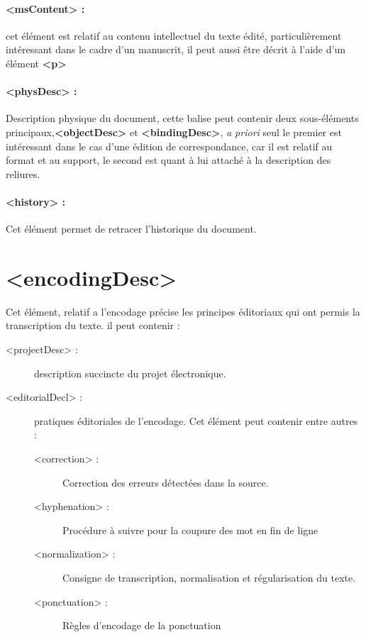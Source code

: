 \documentclass[18pt,a4paper,oneside]{book} %
\begin{document}
\paragraph{<msContent> :}

cet élément est relatif au contenu intellectuel du texte édité, particulièrement intéressant dans le cadre d'un manuscrit, il peut aussi être décrit à l'aide d'un élément \textbf{<p>}

\paragraph{<physDesc> :}

Description physique du document, cette balise peut contenir deux sous-éléments principaux,\textbf{<objectDesc>} et \textbf{<bindingDesc>}, \textit{a priori} seul le premier est intéressant dans le cas d'une édition de correspondance, car il est relatif au format et au support, le second est quant à lui attaché à la description des reliures.

\paragraph{<history> :}

Cet élément permet de retracer l'historique du document. 


\section{<encodingDesc>}

Cet élément, relatif a l'encodage précise les principes éditoriaux qui ont permis la
transcription du texte. il peut contenir : 

\begin{description}
\item [<projectDesc> : ]description succincte du projet électronique.
\item[<editorialDecl> : ]pratiques éditoriales de l'encodage. Cet élément peut contenir entre autres :
\begin{description}
\item[<correction> : ]Correction des erreurs détectées dans la source.
\item[<hyphenation> : ]Procédure à suivre pour la coupure des mot en fin de ligne 
\item[<normalization> : ]Consigne de transcription, normalisation et régularisation du texte.
\item[<ponctuation> : ]Règles d'encodage de la ponctuation
\end{description}
\end{description}
\end{document}
